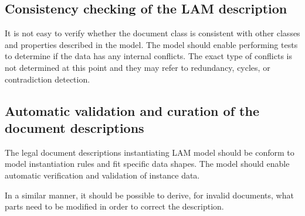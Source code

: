\hypertarget{consistency-checking-of-the-lam-description}{%
\subsection{Consistency checking of the LAM
description}\label{consistency-checking-of-the-lam-description}}

It is not easy to verify whether the document class is consistent with
other classes and properties described in the model. The model should
enable performing tests to determine if the data has any internal
conflicts. The exact type of conflicts is not determined at this point
and they may refer to redundancy, cycles, or contradiction detection.

\hypertarget{automatic-validation-and-curation-of-the-document-descriptions}{%
\subsection{Automatic validation and curation of the document
descriptions}\label{automatic-validation-and-curation-of-the-document-descriptions}}

The legal document descriptions instantiating LAM model should be
conform to model instantiation rules and fit specific data shapes. The
model should enable automatic verification and validation of instance
data.

In a similar manner, it should be possible to derive, for invalid
documents, what parts need to be modified in order to correct the
description.
